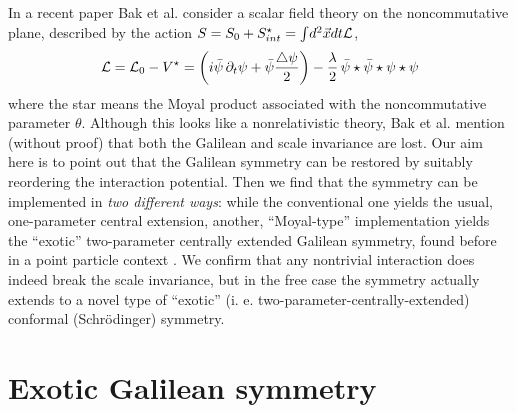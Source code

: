 \documentclass[a4paper,11pt]{article}
\let\ssection=\section
\renewcommand{\section}{\setcounter{equation}{0}\ssection}
\def\p{{\partial}}
\def\vx{{\vec x}}
\begin{document}
In a recent paper  \cite{Baketal}
Bak et al. consider a scalar field theory on
the noncommutative plane, described by the action
$S=S_{0}+S_{int}^\star=\int\!d^2\vx dt{\cal L}$,
\begin{equation}
     {\cal L}={\cal L}_{0}-V^\star
     =\left(i\bar{\psi}\,\p_{t}\psi+
     \bar{\psi}\frac{\bigtriangleup\psi}{2}\right)
     -\frac{\lambda}{2}\,
     \bar{\psi}\star\bar{\psi}\star\psi\star\psi
     \label{action}
\end{equation}
where the star means the Moyal product associated with
the noncommutative parameter $\theta$.  Although this looks
like a nonrelativistic theory, Bak et al. mention (without proof) that
both the Galilean and scale invariance are lost.
Our aim here is to point out that
the Galilean symmetry can be restored by suitably
reordering the interaction potential.
Then we find that the symmetry
can be implemented in {\it two different ways}:
while the conventional
one yields the usual, one-parameter central extension,
another, ``Moyal-type'' implementation yields the
``exotic'' two-parameter centrally extended
Galilean symmetry, found before in a point particle context \cite{LeLe}.
We confirm that any nontrivial interaction
does indeed break the scale invariance, but
in the free case the symmetry
actually extends to a novel type of ``exotic'' (i. e.
two-parameter-centrally-extended) conformal (Schr\"odinger)
symmetry.
\goodbreak

\section{Exotic Galilean symmetry}
\end{document}
